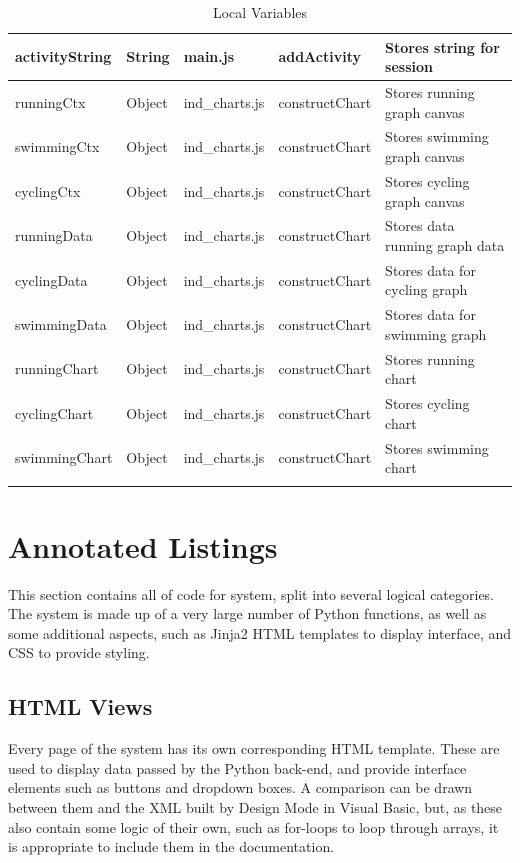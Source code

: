 \documentclass{article}[12pt,a4paper]
\begin{document}
\begin{longtable}{|l|l|l|l|l|}
activityString    & String      & main.js        & addActivity         & Stores string for session           \\ \hline
runningCtx        & Object      & ind\_charts.js & constructChart      & Stores running graph canvas         \\ \hline
swimmingCtx       & Object      & ind\_charts.js & constructChart      & Stores swimming graph canvas        \\ \hline
cyclingCtx        & Object      & ind\_charts.js & constructChart      & Stores cycling graph canvas         \\ \hline
runningData       & Object      & ind\_charts.js & constructChart      & Stores data running graph data      \\ \hline
cyclingData       & Object      & ind\_charts.js & constructChart      & Stores data for cycling graph       \\ \hline
swimmingData      & Object      & ind\_charts.js & constructChart      & Stores data for swimming graph      \\ \hline
runningChart      & Object      & ind\_charts.js & constructChart      & Stores running chart                \\ \hline
cyclingChart      & Object      & ind\_charts.js & constructChart      & Stores cycling chart                \\ \hline
swimmingChart     & Object      & ind\_charts.js & constructChart      & Stores swimming chart               \\ \hline
\caption{Local Variables}
\end{longtable}

\section{Annotated Listings}
This section contains all of code for system, split into several logical categories. The system is made up of a very large number of Python functions, as well as some additional aspects, such as Jinja2 HTML templates to display interface, and CSS to provide styling.

\subsection{HTML Views}
Every page of the system has its own corresponding HTML template. These are used to display data passed by the Python back-end, and provide interface elements such as buttons and dropdown boxes. A comparison can be drawn between them and the XML built by Design Mode in Visual Basic, but, as these also contain some logic of their own, such as for-loops to loop through arrays, it is appropriate to include them in the documentation.
\end{document}
